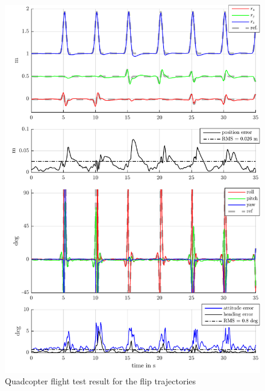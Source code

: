 \begin{figure}
 \centering
 \includegraphics{graphics/QuadFlightTest/QuadFlipResult}
 \caption{Quadcopter flight test result for the flip trajectories}
 \label{fig:QuadFlipResult}
\end{figure}